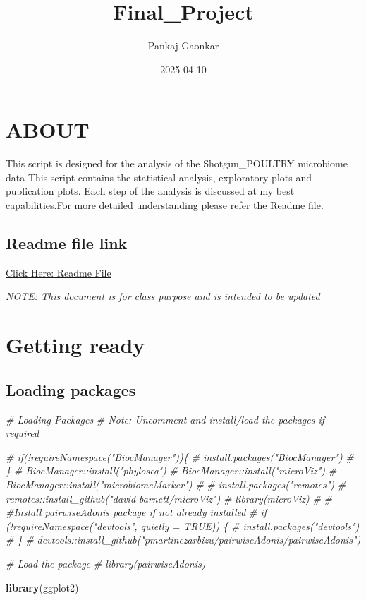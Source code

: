 \documentclass[
]{article}
\title{Final\_Project}
\author{Pankaj Gaonkar}
\date{2025-04-10}
\newenvironment{Shaded}{\begin{snugshade}}{\end{snugshade}}
\newcommand{\CommentTok}[1]{\textcolor[rgb]{0.56,0.35,0.01}{\textit{#1}}}
\newcommand{\FunctionTok}[1]{\textcolor[rgb]{0.13,0.29,0.53}{\textbf{#1}}}
\newcommand{\NormalTok}[1]{#1}
\begin{document}
\maketitle

{
\setcounter{tocdepth}{2}
\tableofcontents
}
\section{\texorpdfstring{\textbf{ABOUT}}{ABOUT}}\label{about}

This script is designed for the analysis of the Shotgun\_POULTRY
microbiome data This script contains the statistical analysis,
exploratory plots and publication plots. Each step of the analysis is
discussed at my best capabilities.For more detailed understanding please
refer the Readme file.

\subsection{Readme file link}\label{readme-file-link}

\href{https://github.com/ppg0001/PLPA_Assignment/blob/main/README.md}{Click
Here: Readme File}

\emph{NOTE: This document is for class purpose and is intended to be
updated}

\section{\texorpdfstring{\textbf{Getting
ready}}{Getting ready}}\label{getting-ready}

\subsection{Loading packages}\label{loading-packages}

\begin{Shaded}
\begin{Highlighting}[]
\CommentTok{\# Loading Packages}
\CommentTok{\# Note: Uncomment and install/load the packages if required}

\CommentTok{\# if(!requireNamespace("BiocManager"))\{}
\CommentTok{\#   install.packages("BiocManager")}
\CommentTok{\# \}}
\CommentTok{\# BiocManager::install("phyloseq")}
\CommentTok{\# BiocManager::install("microViz")}
\CommentTok{\# BiocManager::install("microbiomeMarker")}
\CommentTok{\# }
\CommentTok{\# install.packages("remotes")}
\CommentTok{\# remotes::install\_github("david{-}barnett/microViz")}
\CommentTok{\# library(microViz)}
\CommentTok{\# }
\CommentTok{\# \#Install pairwiseAdonis package if not already installed}
\CommentTok{\# if (!requireNamespace("devtools", quietly = TRUE)) \{}
\CommentTok{\#   install.packages("devtools")}
\CommentTok{\# \}}
\CommentTok{\# devtools::install\_github("pmartinezarbizu/pairwiseAdonis/pairwiseAdonis")}

\CommentTok{\# Load the package}
\CommentTok{\# library(pairwiseAdonis)}


\FunctionTok{library}\NormalTok{(ggplot2)}
\end{Highlighting}
\end{Shaded}
\end{document}
